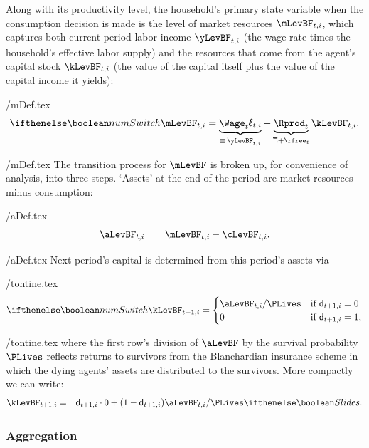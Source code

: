 \documentclass[titlepage]{\econtex}\newcommand{\texname}{cAndCwithStickyE}
\begin{document}
Along with its productivity level, the household's primary state variable when the consumption decision is made is the level of market resources $\mLevBF_{t,i}$, which captures both current period labor income $\yLevBF_{t,i}$ (the wage rate times the household's effective labor supply) and the resources that come from the agent's capital stock $\kLevBF_{t,i}$ (the value of the capital itself plus the value of the capital income it yields):
\begin{verbatimwrite}{\eq/mDef.tex}
\begin{equation}
\ifnumSw \mLevBF_{t,i} = \underbrace{{\bf \Wage}_{t} \pmb{\ell}_{t,i}}_{\equiv\,\yLevBF_{t,i}} + \underbrace{{\Rprod}_t}_{\daleth+\rfree_{t}} \kLevBF_{t,i}.
\label{eq:mDef}
\end{equation}
\end{verbatimwrite}
 \eq/mDef.tex
The transition process for $\mLevBF$ is broken up, for convenience
of analysis, into three steps.  `Assets' at the end of the period are
market resources minus consumption:
\begin{verbatimwrite}{\eq/aDef.tex}
\begin{eqnarray}
   \aLevBF_{t,i} & = & \mLevBF_{t,i}-\cLevBF_{t,i}. \label{eq:aDef}
\end{eqnarray}
\end{verbatimwrite}
 \eq/aDef.tex
Next period's capital is determined from this period's assets via
\begin{verbatimwrite}{\eq/tontine.tex}
\begin{equation*} \ifnumSw
\kLevBF_{t+1,i}  =
\begin{cases}
    \aLevBF_{t,i} /\PLives & \text{if } \pDies_{t+1,i} = 0 \\
     0                       & \text{if } \pDies_{t+1,i} = 1,
\end{cases} \label{eq:tontine}
\end{equation*}
\end{verbatimwrite}
 {\eq/tontine.tex}
where the first row's division of $\aLevBF$ by the survival probability $\PLives$ reflects returns to survivors from the Blanchardian insurance scheme in which the dying agents' assets are distributed to the survivors.  More compactly we can write:
\begin{eqnarray}
  \kLevBF_{t+1,i} & = & \pDies_{t+1,i} \cdot 0+ (1 - \pDies_{t+1,i})\aLevBF_{t,i} /\PLives \label{eq:ktp1icompact}
\ifslides{}{.}
\end{eqnarray}

\subsubsection{Aggregation}
\end{document}

